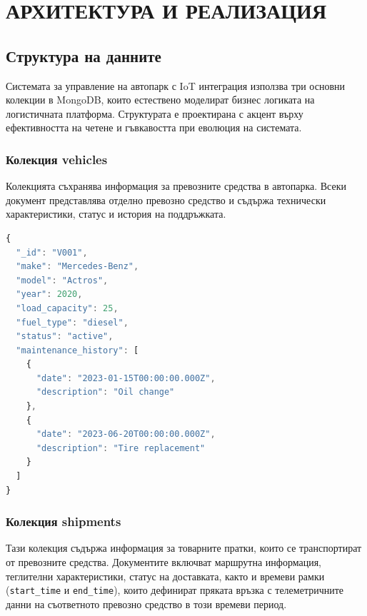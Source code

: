 
\section{АРХИТЕКТУРА И РЕАЛИЗАЦИЯ}

\subsection{Структура на данните}

Системата за управление на автопарк с IoT интеграция използва три основни колекции в MongoDB, които естествено моделират бизнес логиката на логистичната платформа. Структурата е проектирана с акцент върху ефективността на четене и гъвкавостта при еволюция на системата.

\subsubsection{Колекция vehicles}

Колекцията съхранява информация за превозните средства в автопарка. Всеки документ представлява отделно превозно средство и съдържа технически характеристики, статус и история на поддръжката.

\begin{lstlisting}[language=JavaScript,caption=Примерен документ от колекцията vehicles]
{
  "_id": "V001",
  "make": "Mercedes-Benz",
  "model": "Actros",
  "year": 2020,
  "load_capacity": 25,
  "fuel_type": "diesel",
  "status": "active",
  "maintenance_history": [
    {
      "date": "2023-01-15T00:00:00.000Z",
      "description": "Oil change"
    },
    {
      "date": "2023-06-20T00:00:00.000Z",
      "description": "Tire replacement"
    }
  ]
}
\end{lstlisting}

\subsubsection{Колекция shipments}

Тази колекция съдържа информация за товарните пратки, които се транспортират от превозните средства. Документите включват маршрутна информация, теглителни характеристики, статус на доставката, както и времеви рамки (\texttt{start\_time} и \texttt{end\_time}), които дефинират пряката връзка с телеметричните данни на съответното превозно средство в този времеви период.

